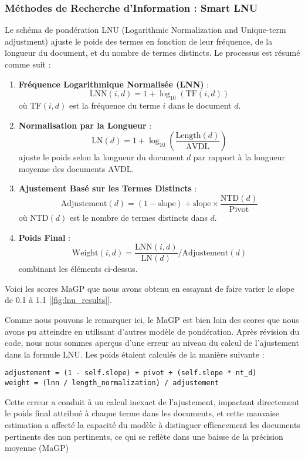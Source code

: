 \documentclass[a4paper, 12pt]{article}
\begin{document}
\subsubsection{Méthodes de Recherche d'Information : Smart LNU}
Le schéma de pondération LNU (Logarithmic Normalization and Unique-term adjustment) ajuste le poids des termes en fonction de leur fréquence, de la longueur du document, et du nombre de termes distincts. Le processus est résumé comme suit :

\begin{enumerate}
    \item \textbf{Fréquence Logarithmique Normalisée (LNN)} : 
    \begin{equation}
    \text{LNN}(i, d) = 1 + \log_{10}(\text{TF}(i, d))
    \end{equation}
    où \(\text{TF}(i, d)\) est la fréquence du terme \(i\) dans le document \(d\).
    
    \item \textbf{Normalisation par la Longueur} : 
    \begin{equation}
    \text{LN}(d) = 1 + \log_{10}\left(\frac{\text{Length}(d)}{\text{AVDL}}\right)
    \end{equation}
    ajuste le poids selon la longueur du document \(d\) par rapport à la longueur moyenne des documents \(\text{AVDL}\).
    
    \item \textbf{Ajustement Basé sur les Termes Distincts} : 
    \begin{equation}
    \text{Adjustement}(d) = (1 - \text{slope}) + \text{slope} \times \frac{\text{NTD}(d)}{\text{Pivot}}
    \end{equation}
    où \(\text{NTD}(d)\) est le nombre de termes distincts dans \(d\).
    
    \item \textbf{Poids Final} : 
    \begin{equation}
    \text{Weight}(i, d) = \frac{\text{LNN}(i, d)}{\text{LN}(d)} / \text{Adjustement}(d)
    \end{equation}
    combinant les éléments ci-dessus.
\end{enumerate}
Voici les scores MaGP que nous avons obtenu en essayant de faire varier le slope de 0.1 à 1.1 
[\ref{fig:lnu_results}].

Comme nous pouvons le remarquer ici, le MaGP est bien loin des scores que nous avons pu atteindre en utilisant d'autres modèle de pondération. Après révision du code, nous nous sommes aperçus d'une erreur au niveau du calcul de l'ajustement dans la formule LNU. 
Les poids étaient calculés de la manière suivante :
\begin{center}
\texttt{adjustement = (1 - self.slope) + pivot + (self.slope * nt\_d) \\
weight = (lnn / length\_normalization) / adjustement}
\end{center} 
Cette erreur a conduit à un calcul inexact de l'ajustement, impactant directement le poids final attribué à chaque terme dans les documents, et cette mauvaise estimation a affecté la capacité du modèle à distinguer efficacement les documents pertinents des non pertinents, ce qui se reflète dans une baisse de la précision moyenne (MaGP)
\end{document}
